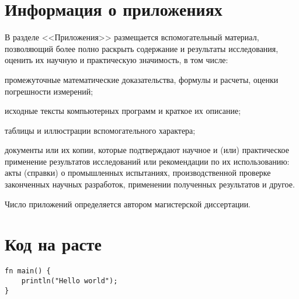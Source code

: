 \appendix
\chapter{Информация о приложениях}
В разделе <<Приложения>> размещается вспомогательный материал, позволяющий более полно раскрыть содержание и результаты исследования, оценить их научную и практическую значимость, в том числе:

промежуточные математические доказательства, формулы и расчеты, оценки погрешности измерений;

исходные тексты компьютерных программ и краткое их описание;

таблицы и иллюстрации вспомогательного характера;

документы или их копии, которые подтверждают научное и (или) практическое применение результатов исследований или рекомендации по их использованию: акты (справки) о промышленных испытаниях, производственной проверке законченных научных разработок, применении полученных результатов и другое.

Число приложений определяется автором магистерской диссертации.

\chapter{Код на расте}

\begin{verbatim}
fn main() {
    println("Hello world");
}
\end{verbatim}